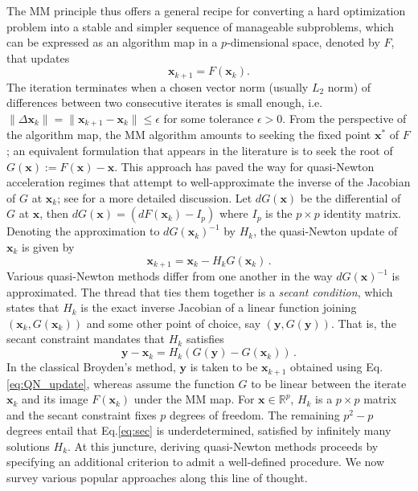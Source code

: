 \documentclass{statsoc}
\newcommand{\bx}{\boldsymbol{x}}
\newcommand{\by}{\boldsymbol{y}}
\begin{document}
The MM principle thus offers a general recipe for converting a hard optimization problem into a stable and simpler sequence of manageable subproblems, which can be expressed as an algorithm map in a $p$-dimensional space, denoted by $F$, that updates
\[
\bx_{k+1} = F(\bx_k).
\]
The iteration terminates when a chosen vector norm (usually $L_2$ norm) of differences between two consecutive iterates is small enough, i.e. $\|\Delta \bx_k\| = \|\bx_{k+1} - \bx_k\| \leq \epsilon$ for some tolerance $\epsilon > 0$. From the perspective of the algorithm map, the MM algorithm amounts to seeking the fixed point $\bx^\ast$ of $F$; an equivalent formulation that appears in the literature is to seek the root  of $G(\bx) := F(\bx) - \bx$. This approach has paved the way for quasi-Newton acceleration regimes that attempt to well-approximate the inverse of the Jacobian of $G$ at $\bx_k$; see \cite{luenberger1984linear, dennis1996numerical} for a more detailed discussion. Let $dG(\bx)$ be the differential of $G$ at $\bx$, then $dG(\bx) = (dF(\bx_k) - I_p)$ where $I_p$ is the $p \times p$ identity matrix. Denoting the approximation to $dG(\bx_k)^{-1}$ by $H_k$, the quasi-Newton update of $\bx_k$ is given by
\begin{equation}\label{eq:QN_update}
  \bx_{k+1} = \bx_k - H_k G(\bx_k)\,.  
\end{equation}
Various quasi-Newton methods differ from one another in the way $dG(\bx)^{-1}$ is approximated. The thread that ties them together is a \textit{secant condition}, which states that $H_k$ is the exact inverse Jacobian of a linear function joining $(\bx_k, G(\bx_k))$ and some other point of choice, say $(\by, G(\by))$. That is, the secant constraint mandates that $H_k$ satisfies
\begin{equation}\label{eq:sec}
\by - \bx_k = H_k (G(\by) - G(\bx_k))\,.
\end{equation}
In the classical Broyden's method, $\by$ is taken to be $\bx_{k+1}$ obtained using Eq.\eqref{eq:QN_update}, whereas \cite{zhou2011quasi} assume the function $G$ to be linear between the iterate $\bx_k$ and its image $ F(\bx_k)$ under the MM map. For $\bx  \in \mathbb{R}^p$,  $H_k$ is a $p \times p$ matrix and the secant constraint fixes $p$ degrees of freedom. The remaining $p^2 - p$ degrees entail that Eq.\eqref{eq:sec} is underdetermined, satisfied by infinitely many solutions $H_k$. At this juncture, deriving quasi-Newton methods proceeds by specifying an additional criterion to admit a well-defined procedure. We now survey various popular approaches along this line of thought.
\end{document}
